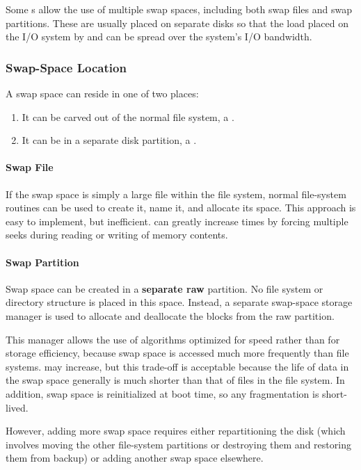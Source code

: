 Some s allow the use of multiple swap spaces, including both swap files and swap partitions.
These are usually placed on separate disks so that the load placed on the I/O system by  and  can be spread over the system’s I/O bandwidth.

\subsubsection{Swap-Space Location}\label{subsubsec:Swap_Space_Location}
A swap space can reside in one of two places:
\begin{enumerate}[noitemsep]
\item It can be carved out of the normal file system, a .
\item It can be in a separate disk partition, a .
\end{enumerate}

\paragraph{Swap File}\label{par:Swap_File}
If the swap space is simply a large file within the file system, normal file-system routines can be used to create it, name it, and allocate its space.
This approach is easy to implement, but inefficient.
 can greatly increase  times by forcing multiple seeks during reading or writing of memory contents.

\paragraph{Swap Partition}\label{par:Swap_Partition}
Swap space can be created in a \textbf{separate raw} partition.
No file system or directory structure is placed in this space.
Instead, a separate swap-space storage manager is used to allocate and deallocate the blocks from the raw partition.

This manager allows the use of algorithms optimized for speed rather than for storage efficiency, because swap space is accessed much more frequently than file systems.
 may increase, but this trade-off is acceptable because the life of data in the swap space generally is much shorter than that of files in the file system.
In addition, swap space is reinitialized at boot time, so any fragmentation is short-lived.

However, adding more swap space requires either repartitioning the disk (which involves moving the other file-system partitions or destroying them and restoring them from backup) or adding another swap space elsewhere.

